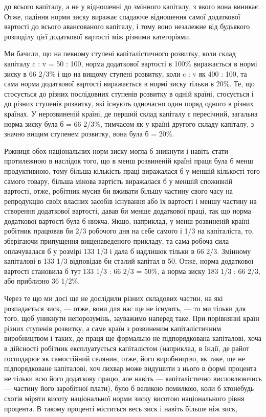 \parcont{}  %
до всього капіталу, а не у відношенні до змінного капіталу, з
якого вона виникає. Отже, падіння норми зиску виражає спадаюче
відношення самої додаткової вартості до всього авансованого
капіталу, і тому воно незалежне від будьякого розподілу
цієї додаткової вартості між різними категоріями.

Ми бачили, що на певному ступені капіталістичного розвитку,
коли склад капіталу c : v = 50 : 100, норма додаткової вартості
в 100\% виражається в нормі зиску в 66 2/3\% і що на вищому
ступені розвитку, коли c : v як 400 : 100, та сама норма додаткової
вартості виражається в нормі зиску тільки в 20\%. Те, що
стосується до різних послідовних ступенів розвитку в одній
країні, стосується і до різних ступенів розвитку, які існують
одночасно один поряд одного в різних країнах. У нерозвиненій
країні, де перший склад капіталу є пересічний, загальна норма
зиску була б = 66 2/3\%, тимчасом як у країні другого складу капіталу,
з значно вищим ступенем розвитку, вона була б = 20\%.

Ріжниця обох національних норм зиску могла б зникнути і
навіть стати протилежною в наслідок того, що в менш розвиненій
країні праця була б менш продуктивною, тому більша
кількість праці виражалася б у меншій кількості того самого
товару, більша мінова вартість виражалася б у меншій споживній
вартості, отже, робітник мусив би вживати більшу частину
свого часу на репродукцію своїх власних засобів існування або
їх вартості і меншу частину на створення додаткової вартості,
давав би менше додаткової праці, так що норма додаткової
вартості була б нижча. Якщо, наприклад, у менш розвиненій країні
робітник працював би 2/3 робочого дня на себе самого і 1/3 на
капіталіста, то, зберігаючи припущення вищенаведеного прикладу,
та сама робоча сила оплачувалася б у розмірі 133 1/3 і дала б
надлишок тільки в 66 2/3. Змінному капіталові в 133 1/3 відповідав
би сталий капітал в 50. Отже, норма додаткової вартості становила
б тут 133 1/3 : 66 2/3 = 50\%, а норма зиску 183 1/3 : 66 2/3, або
приблизно 36 1/2\%.

Через те що ми досі ще не дослідили різних складових частин,
на які розпадається зиск, — отже, вони для нас ще не існують,
— то ми тільки для того, щоб уникнути непорозумінь,
зауважимо наперед таке. При порівнянні країн різних ступенів
розвитку, а саме країн з розвиненим капіталістичним виробництвом
і таких, де праця ще формально не підпорядкована капіталові,
хоча в дійсності робітник експлуатується капіталістом
(наприклад, в Індії, де райот господарює як самостійний селянин,
отже, його виробництво, як таке, ще не підпорядковане капіталові,
хоч лихвар може видушити з нього в формі процента
не тільки всю його додаткову працю, але навіть — капіталістично
висловлюючись — частину його заробітної плати), було б
великою помилкою, коли б хтонебудь схотів міряти висоту національної
норми зиску висотою національного рівня процента.
В такому проценті міститься весь зиск і навіть більше ніж зиск,
\parbreak{}  %
